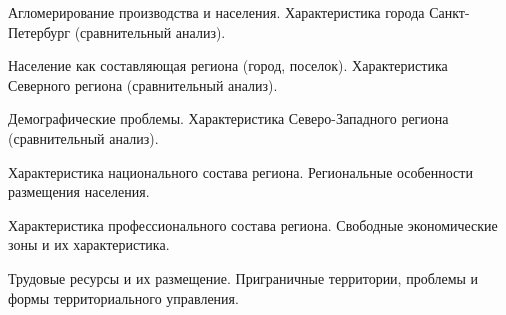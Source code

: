 \documentclass[
	14pt,
	a4paper,
	]
	{scrartcl}
\begin{document}
\vfill

\newpage


\shapk
{}
\setcounter{zad}{0}

\vfill
\z Агломерирование производства и населения.
 \vfill
\z Характеристика города Санкт-Петербург (сравнительный анализ).
 \vfill

\vfill

\newpage


\shapk
{}
\setcounter{zad}{0}

\vfill
\z Население как составляющая региона (город, поселок).
 \vfill
\z Характеристика Северного региона (сравнительный анализ).
 \vfill

\vfill

\newpage


\shapk
{}
\setcounter{zad}{0}

\vfill
\z Демографические проблемы.
 \vfill
\z Характеристика Северо-Западного региона (сравнительный анализ).
 \vfill

\vfill

\newpage


\shapk
{}
\setcounter{zad}{0}

\vfill
\z Характеристика национального состава региона.
 \vfill
\z Региональные особенности размещения населения.
 \vfill

\vfill

\newpage


\shapk
{}
\setcounter{zad}{0}

\vfill
\z Характеристика профессионального состава региона.
 \vfill
\z Свободные экономические зоны и их характеристика.
 \vfill

\vfill

\newpage


\shapk
{}
\setcounter{zad}{0}

\vfill
\z Трудовые ресурсы и их размещение.
 \vfill
\z Приграничные территории, проблемы и формы территориального управления.
 \vfill

\vfill

\newpage
\end{document}
